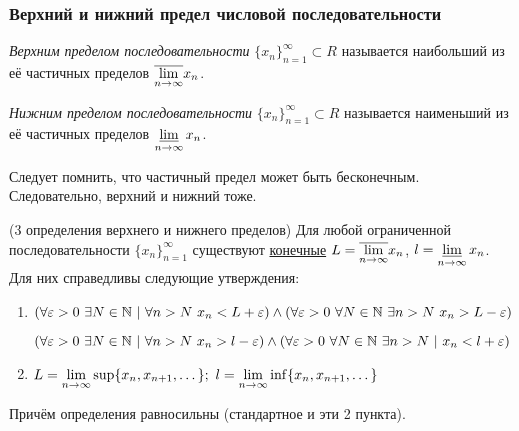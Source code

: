 \subsubsection{Верхний и нижний предел числовой последовательности}

\begin{definition}
	\textit{Верхним пределом последовательности} $\{x_n\}_{n = 1}^\infty \subset R$ называется наибольший из её частичных пределов $\overline{\lim\limits_{n \rightarrow \infty}} x_n$.
\end{definition}

\begin{definition}
	\textit{Нижним пределом последовательности} $\{x_n\}_{n = 1}^\infty \subset R$ называется наименьший из её частичных пределов $\varliminf\limits_{n \rightarrow \infty} x_n$.
\end{definition}

\begin{anote}
	Следует помнить, что частичный предел может быть бесконечным. Следовательно, верхний и нижний тоже.
\end{anote}

\begin{theorem} (3 определения верхнего и нижнего пределов)
	Для любой ограниченной последовательности $\{x_n\}_{n = 1}^\infty$ существуют \underline{конечные} $L = \overline{\lim\limits_{n \to \infty}} x_n$, $l = \varliminf\limits_{n \to \infty} x_n$. Для них справедливы следующие утверждения:
	\begin{enumerate}
		\item $(\forall \eps > 0\ \exists N \in \N\ |\ \forall n > N\ x_n < L + \eps) \wedge (\forall \eps > 0\ \forall N \in \N\ \exists n > N\ x_n > L - \eps)$
		
		$(\forall \eps > 0\ \exists N \in \N\ |\ \forall n > N\ x_n > l - \eps) \wedge (\forall \eps > 0\ \forall N \in \N\ \exists n > N\ |\ x_n < l + \eps)$
		
		\item $L = \lim\limits_{n \to \infty} \sup \{x_n, x_{n + 1}, \dots\};\ l = \lim\limits_{n \to \infty} \inf \{x_n, x_{n + 1}, \dots\}$
	\end{enumerate}
	Причём определения равносильны (стандартное и эти 2 пункта).
\end{theorem}

